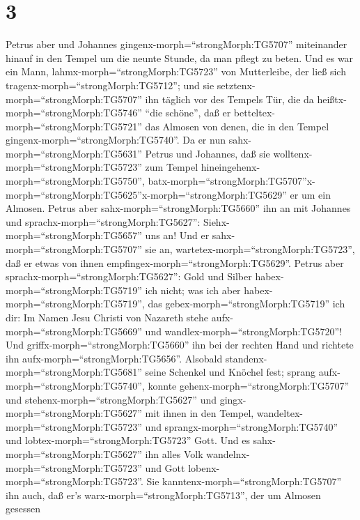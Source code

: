 \hypertarget{section-2}{%
\section{3}\label{section-2}}

 Petrus aber und Johannes
gingenx-morph=``strongMorph:TG5707'' miteinander hinauf in den Tempel um
die neunte Stunde, da man pflegt zu beten.  Und es war ein
Mann, lahmx-morph=``strongMorph:TG5723'' von Mutterleibe, der ließ sich
tragenx-morph=``strongMorph:TG5712''; und sie
setztenx-morph=``strongMorph:TG5707'' ihn täglich vor des Tempels Tür,
die da heißtx-morph=``strongMorph:TG5746'' ``die schöne'', daß er
betteltex-morph=``strongMorph:TG5721'' das Almosen von denen, die in den
Tempel gingenx-morph=``strongMorph:TG5740''.  Da er nun
sahx-morph=``strongMorph:TG5631'' Petrus und Johannes, daß sie
wolltenx-morph=``strongMorph:TG5723'' zum Tempel
hineingehenx-morph=``strongMorph:TG5750'',
batx-morph=``strongMorph:TG5707''\textbar x-morph=``strongMorph:TG5625''x-morph=``strongMorph:TG5629''
er um ein Almosen.  Petrus aber
sahx-morph=``strongMorph:TG5660'' ihn an mit Johannes und
sprachx-morph=``strongMorph:TG5627'': Siehx-morph=``strongMorph:TG5657''
uns an!  Und er sahx-morph=``strongMorph:TG5707'' sie an,
wartetex-morph=``strongMorph:TG5723'', daß er etwas von ihnen
empfingex-morph=``strongMorph:TG5629''.  Petrus aber
sprachx-morph=``strongMorph:TG5627'': Gold und Silber
habex-morph=``strongMorph:TG5719'' ich nicht; was ich aber
habex-morph=``strongMorph:TG5719'', das
gebex-morph=``strongMorph:TG5719'' ich dir: Im Namen Jesu Christi von
Nazareth stehe aufx-morph=``strongMorph:TG5669'' und
wandlex-morph=``strongMorph:TG5720''!  Und
griffx-morph=``strongMorph:TG5660'' ihn bei der rechten Hand und
richtete ihn aufx-morph=``strongMorph:TG5656''. Alsobald
standenx-morph=``strongMorph:TG5681'' seine Schenkel und Knöchel fest;
 sprang aufx-morph=``strongMorph:TG5740'', konnte
gehenx-morph=``strongMorph:TG5707'' und
stehenx-morph=``strongMorph:TG5627'' und
gingx-morph=``strongMorph:TG5627'' mit ihnen in den Tempel,
wandeltex-morph=``strongMorph:TG5723'' und
sprangx-morph=``strongMorph:TG5740'' und
lobtex-morph=``strongMorph:TG5723'' Gott.  Und es
sahx-morph=``strongMorph:TG5627'' ihn alles Volk
wandelnx-morph=``strongMorph:TG5723'' und Gott
lobenx-morph=``strongMorph:TG5723''.  Sie
kanntenx-morph=``strongMorph:TG5707'' ihn auch, daß er's
warx-morph=``strongMorph:TG5713'', der um Almosen gesessen
